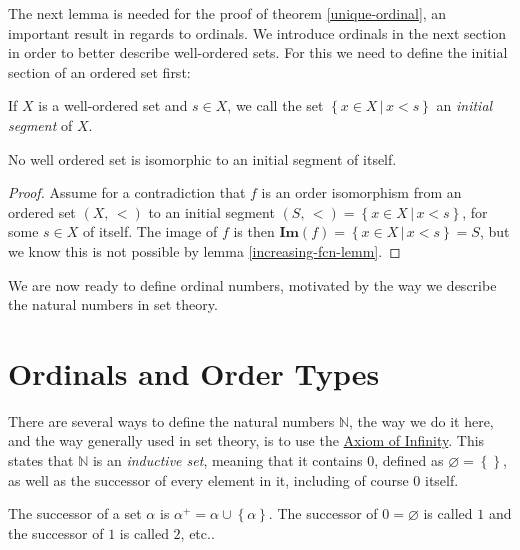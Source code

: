 \documentclass[../../main.tex]{subfiles}
\begin{document}
The next lemma is needed for the proof of theorem \ref{unique-ordinal}, an important result in regards to ordinals.
We introduce ordinals in the next section in order to better describe well-ordered sets.
For this we need to define the initial section of an ordered set first:

\begin{definition}
    If $X$ is a well-ordered set and $s \in X$, we call the set $\left\{x \in X \,\vert\, x < s\right\}$ an \textit{initial segment} of $X$.
\end{definition}

\begin{lemma}\cite[Lemma 2.2, p.13]{Jec78}
    No well ordered set is isomorphic to an initial segment of itself.
\end{lemma}

\begin{proof}\cite[Lemma 2.2, p.13]{Jec78}
    Assume for a contradiction that $f$ is an order isomorphism from an ordered set $\left(X,\, <\right)$ to an initial segment $\left(S,\, <\right) = \left\{x \in X \,\vert\, x < s\right\}$, for some $s \in X$ of itself.
    The image of $f$ is then $\mathbf{Im}\left(f\right) = \left\{x \in X \,\vert\, x < s\right\} = S$, but we know this is not possible by lemma \ref{increasing-fcn-lemm}. 
\end{proof}

We are now ready to define ordinal numbers, motivated by the way we describe the natural numbers in set theory.

\section{Ordinals and Order Types}
There are several ways to define the natural numbers $\mathbb{N}$, the way we do it here, and the way generally used in set theory, is to use the \hyperref[ZF7]{Axiom of Infinity}.
This states that $\mathbb{N}$ is an \textit{inductive set}, meaning that it contains $0$, defined as $\varnothing = \left\{\right\}$, as well as the successor of every element in it, including of course $0$ itself. \cite[p.39]{Gol17}

\begin{definition}\cite[p.38]{Gol17}
    The successor of a set $\alpha$ is $\alpha^+ = \alpha \cup \left\{\alpha\right\}$.
    The successor of $0 = \varnothing$ is called $1$ and the successor of $1$ is called $2$, etc.. 
\end{definition}
\end{document}
